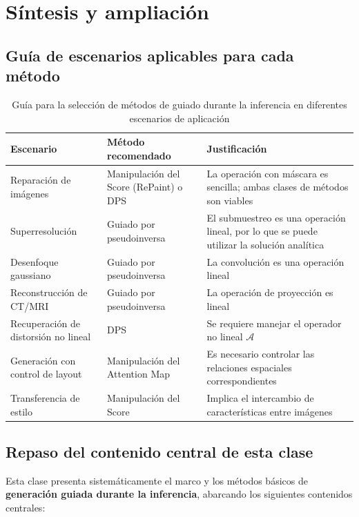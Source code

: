 \documentclass[a4paper]{article}
\begin{document}
\section{Síntesis y ampliación}

\subsection{Guía de escenarios aplicables para cada método}

\begin{table}[H]
\centering
\begin{tabular}{p{}p{}p{}}
\toprule
\textbf{Escenario} & \textbf{Método recomendado} & \textbf{Justificación} \\
\midrule
Reparación de imágenes & Manipulación del Score (RePaint) o DPS & La operación con máscara es sencilla; ambas clases de métodos son viables \\
Superresolución & Guiado por pseudoinversa & El submuestreo es una operación lineal, por lo que se puede utilizar la solución analítica \\
Desenfoque gaussiano & Guiado por pseudoinversa & La convolución es una operación lineal \\
Reconstrucción de CT/MRI & Guiado por pseudoinversa & La operación de proyección es lineal \\
Recuperación de distorsión no lineal & DPS & Se requiere manejar el operador no lineal $\mathcal{A}$ \\
Generación con control de layout & Manipulación del Attention Map & Es necesario controlar las relaciones espaciales correspondientes \\
Transferencia de estilo & Manipulación del Score & Implica el intercambio de características entre imágenes \\
\bottomrule
\end{tabular}
\caption{Guía para la selección de métodos de guiado durante la inferencia en diferentes escenarios de aplicación}
\end{table}

\subsection{Repaso del contenido central de esta clase}

Esta clase presenta sistemáticamente el marco y los métodos básicos de \textbf{generación guiada durante la inferencia}, abarcando los siguientes contenidos centrales:
\end{document}
